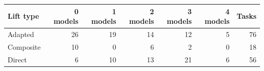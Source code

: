 \begin{tabular}{lrrrrrr}
\toprule
\textbf{Lift type} & \textbf{0 models} & \textbf{1 models} & \textbf{2 models} & \textbf{3 models} & \textbf{4 models} & \textbf{Tasks} \\
\midrule
Adapted & 26 & 19 & 14 & 12 & 5 & 76 \\
Composite & 10 & 0 & 6 & 2 & 0 & 18 \\
Direct & 6 & 10 & 13 & 21 & 6 & 56 \\
\bottomrule
\end{tabular}
